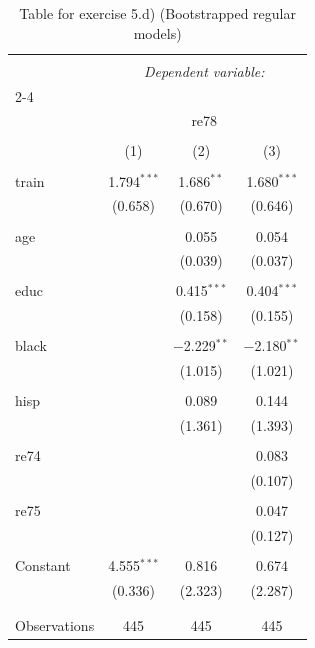 
\begin{table}[!htbp] \centering 
  \caption{Table for exercise 5.d) (Bootstrapped regular models)} 
  \label{} 
\begin{tabular}{@{\extracolsep{5pt}}lccc} 
\\[-1.8ex]\hline 
\hline \\[-1.8ex] 
 & \multicolumn{3}{c}{\textit{Dependent variable:}} \\ 
\cline{2-4} 
\\[-1.8ex] & \multicolumn{3}{c}{re78} \\ 
\\[-1.8ex] & (1) & (2) & (3)\\ 
\hline \\[-1.8ex] 
 train & 1.794$^{***}$ & 1.686$^{**}$ & 1.680$^{***}$ \\ 
  & (0.658) & (0.670) & (0.646) \\ 
  & & & \\ 
 age &  & 0.055 & 0.054 \\ 
  &  & (0.039) & (0.037) \\ 
  & & & \\ 
 educ &  & 0.415$^{***}$ & 0.404$^{***}$ \\ 
  &  & (0.158) & (0.155) \\ 
  & & & \\ 
 black &  & $-$2.229$^{**}$ & $-$2.180$^{**}$ \\ 
  &  & (1.015) & (1.021) \\ 
  & & & \\ 
 hisp &  & 0.089 & 0.144 \\ 
  &  & (1.361) & (1.393) \\ 
  & & & \\ 
 re74 &  &  & 0.083 \\ 
  &  &  & (0.107) \\ 
  & & & \\ 
 re75 &  &  & 0.047 \\ 
  &  &  & (0.127) \\ 
  & & & \\ 
 Constant & 4.555$^{***}$ & 0.816 & 0.674 \\ 
  & (0.336) & (2.323) & (2.287) \\ 
  & & & \\ 
\hline \\[-1.8ex] 
Observations & 445 & 445 & 445 \\ 

\end{tabular}
\end{table}
